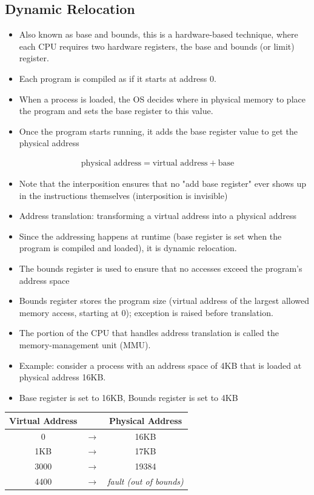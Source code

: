 \documentclass[11pt, a4paper]{article}
\theoremstyle{definition}
\theoremstyle{remark}
\begin{document}
\subsection{Dynamic Relocation}
\begin{itemize}
  \item Also known as base and bounds, this is a hardware-based technique, where each CPU requires two hardware registers, the base and bounds (or limit) register.
  \item Each program is compiled as if it starts at address 0.
  \item When a process is loaded, the OS decides where in physical memory to place the program and sets the base register to this value. 
  \item Once the program starts running, it adds the base register value to get the physical address
\end{itemize}
\begin{align*}
\text{physical address} = \text{virtual address} + \text{base}
\end{align*}
\begin{itemize}
  \item Note that the interposition ensures that no "add base register" ever shows up in the instructions themselves (interposition is invisible)
  \item Address translation: transforming a virtual address into a physical address 
  \item Since the addressing happens at runtime (base register is set when the program is compiled and loaded), it is dynamic relocation.
  \item The bounds register is used to ensure that no accesses exceed the program's address space
  \item Bounds register stores the program size (virtual address of the largest allowed memory access, starting at 0); exception is raised before translation.
  \item The portion of the CPU that handles address translation is called the memory-\hspace{0pt}management unit (MMU).
  \item Example: consider a process with an address space of 4KB that is loaded at physical address 16KB.
  \item Base register is set to 16KB, Bounds register is set to 4KB
\end{itemize}
\begin{center}
\begin{tabular}{c c c}
  \textbf{Virtual Address} && \textbf{Physical Address} \\
  \hline 
  0 & $\rightarrow$ & 16KB \\ 
  1KB & $\rightarrow$ & 17KB \\ 
  3000 & $\rightarrow$ & 19384 \\ 
  4400 & $\rightarrow$  & \textit{fault (out of bounds)} \\
\end{tabular}
\end{center}
\end{document}
